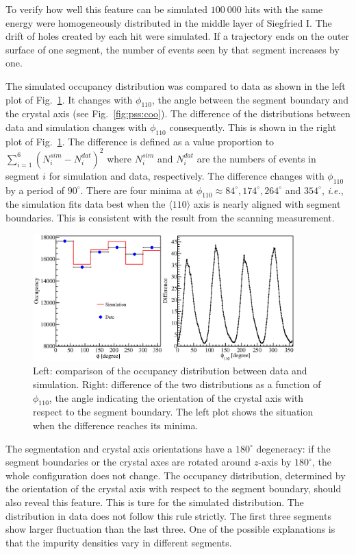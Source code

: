 To verify how well this feature can be simulated $100\ 000$ hits with the same energy were homogeneously distributed in the middle layer of Siegfried I. The drift of holes created by each hit were simulated. If a trajectory ends on the outer surface of one segment, the number of events seen by that segment increases by one. 

The simulated occupancy distribution was compared to data as shown in the left plot of Fig.~\ref{fig:psa:focc}. It changes with $\phi_{110}$, the angle between the segment boundary and the crystal axis (see Fig.~\ref{fig:pss:coo}). The difference of the distributions between data and simulation changes with $\phi_{110}$ consequently. This is shown in the right plot of Fig.~\ref{fig:psa:focc}. The difference is defined as a value proportion to $\sum_{i=1}^{6} (N_{i}^{sim}-N_{i}^{dat})^{2}$ where $N_{i}^{sim}$ and $N_{i}^{dat}$ are the numbers of events in segment $i$ for simulation and data, respectively. The difference changes with $\phi_{110}$ by a period of $90^{\circ}$. There are four minima at $\phi_{110} \approx 84^{\circ}, 174^{\circ}, 264^{\circ}$ and $354^{\circ}$, \textit{i.e.}, the simulation fits data best when the $\langle 110 \rangle$ axis is nearly aligned with segment boundaries. This is consistent with the result from the scanning measurement.

\begin{figure}[htbp]
\centering
\includegraphics[width=0.9\textwidth]{fitocc}
\caption{Left: comparison of the occupancy distribution between data and simulation. Right: difference of the two distributions as a function of $\phi_{110}$, the angle indicating the orientation of the crystal axis with respect to the segment boundary. The left plot shows the situation when the difference reaches its minima.}
\label{fig:psa:focc}
\end{figure}

The segmentation and crystal axis orientations have a $180^{\circ}$ degeneracy: if the segment boundaries or the crystal axes are rotated around $z$-axis by $180^{\circ}$, the whole configuration does not change. The occupancy distribution, determined by the orientation of the crystal axis with respect to the segment boundary, should also reveal this feature. This is ture for the simulated distribution. The distribution in data does not follow this rule strictly. The first three segments show larger fluctuation than the last three. One of the possible explanations is that the impurity densities vary in different segments.

